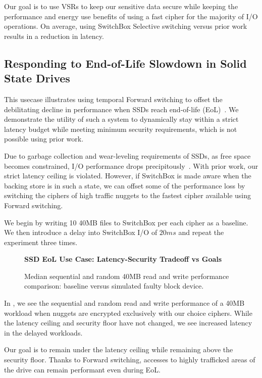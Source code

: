 Our goal is to use VSRs to keep our sensitive data secure while keeping the
performance and energy use benefits of using a fast cipher for the majority of
I/O operations. On average, using SwitchBox Selective switching versus prior
work results in a  reduction in latency.

\subsection{Responding to End-of-Life Slowdown in Solid State Drives}

This usecase illustrates using temporal Forward switching to offset the
debilitating decline in performance when SSDs reach end-of-life
(EoL)~\cite{SSDEOL1, SSDEOL2, SSDEOL3}. We demonstrate the utility of such a
system to dynamically stay within a strict latency budget while meeting minimum
security requirements, which is not possible using prior work.

Due to garbage collection and wear-leveling requirements of SSDs, as free space
becomes constrained, I/O performance drops precipitously~\cite{SSDEOL1, SSDEOL2,
SSDEOL3}. With prior work, our strict latency ceiling is violated. However, if
SwitchBox is made aware when the backing store is in such a state, we can offset
some of the performance loss by switching the ciphers of high traffic nuggets to
the fastest cipher available using Forward switching.

We begin by writing 10 40MB files to SwitchBox per each cipher as a baseline. We
then introduce a delay into SwitchBox I/O of $20ms$ and repeat the experiment
three times.

\begin{figure}[ht] \textbf{SSD EoL Use Case: Latency-Security Tradeoff vs
   Goals}\par\medskip
   {} \caption{Median sequential and
   random 40MB read and write performance comparison: baseline versus simulated
   faulty block device.}
  \label{fig:usecase-eol-tradeoff}
\end{figure}

In , we see the sequential and random read and
write performance of a 40MB workload when nuggets are encrypted exclusively with
our choice ciphers. While the latency ceiling and security floor have not
changed, we see increased latency in the delayed workloads.

Our goal is to remain under the latency ceiling while remaining above the
security floor. Thanks to Forward switching, accesses to highly trafficked areas
of the drive can remain performant even during EoL.

